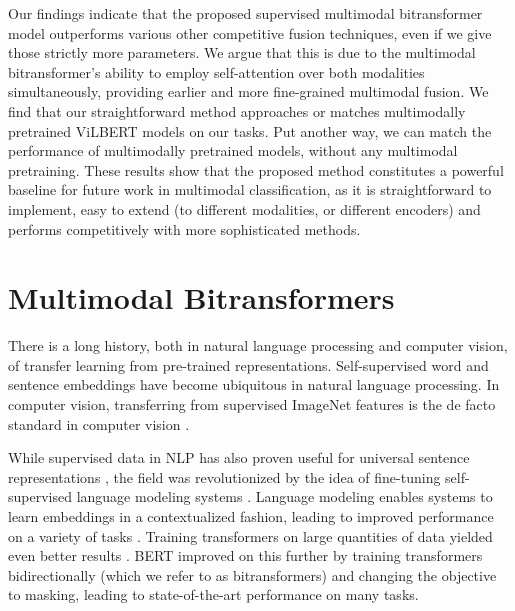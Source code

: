 \documentclass[11pt,a4paper]{article}
\begin{document}
Our findings indicate that the proposed supervised multimodal bitransformer model outperforms various other competitive fusion techniques, 
even if we give those strictly more parameters. We argue that this is due to the multimodal bitransformer's ability to employ self-attention over both modalities simultaneously, providing earlier and more fine-grained multimodal fusion. We find that our straightforward method approaches or matches multimodally pretrained ViLBERT models on our tasks. Put another way, we can match the performance of multimodally pretrained models, without any multimodal pretraining. These results show that the proposed method constitutes a powerful baseline for future work in multimodal classification, as it is straightforward to implement, easy to extend (to different modalities, or different encoders) and performs competitively with more sophisticated methods.

\section{Multimodal Bitransformers}

There is a long history, both in natural language processing and computer vision, of transfer learning from pre-trained representations. Self-supervised word and sentence embeddings \cite{Collobert:2008icml,Mikolov:2013nips,Kiros:2015nips} have become ubiquitous in natural language processing. In computer vision, transferring from supervised ImageNet features is the de facto standard in computer vision \cite{Oquab:2014cvpr,Razavian:2014cvpr}.

While supervised data in NLP has also proven useful for universal sentence representations \cite{Conneau:2017emnlp}, the field was revolutionized by the idea of fine-tuning self-supervised language modeling systems \cite{Dai:2015nips}. Language modeling enables systems to learn embeddings in a contextualized fashion, leading to improved performance on a variety of tasks \cite{Peters:2018naacl,Howard:2018acl}. Training transformers \cite{Vaswani:2017nips} on large quantities of data yielded even better results \cite{Radford:2018tr}. BERT \cite{Devlin:2019naacl} improved on this further by training transformers bidirectionally (which we refer to as bitransformers) and changing the objective to masking, leading to state-of-the-art performance on many tasks.
\end{document}
